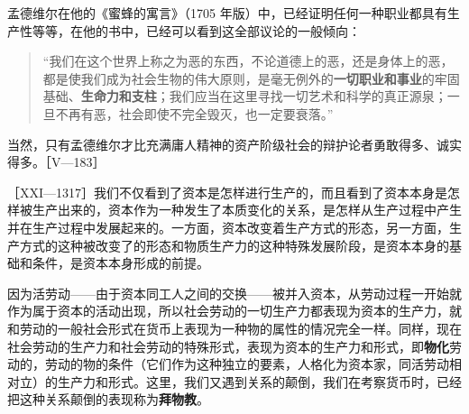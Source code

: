 孟德维尔在他的《蜜蜂的寓言》（1705 年版）中，已经证明任何一种职业都具有生产性等等，在他的书中，已经可以看到这全部议论的一般倾向：

\begin{quote}“我们在这个世界上称之为恶的东西，不论道德上的恶，还是身体上的恶，都是使我们成为社会生物的伟大原则，是毫无例外的\textbf{一切职业和事业}的牢固基础、\textbf{生命力和支柱}；我们应当在这里寻找一切艺术和科学的真正源泉；一旦不再有恶，社会即使不完全毁灭，也一定要衰落。”\end{quote}

当然，只有孟德维尔才比充满庸人精神的资产阶级社会的辩护论者勇敢得多、诚实得多。［V—183］



［XXI—1317］我们不仅看到了资本是怎样进行生产的，而且看到了资本本身是怎样被生产出来的，资本作为一种发生了本质变化的关系，是怎样从生产过程中产生并在生产过程中发展起来的。一方面，资本改变着生产方式的形态，另一方面，生产方式的这种被改变了的形态和物质生产力的这种特殊发展阶段，是资本本身的基础和条件，是资本本身形成的前提。

因为活劳动——由于资本同工人之间的交换——被并入资本，从劳动过程一开始就作为属于资本的活动出现，所以社会劳动的一切生产力都表现为资本的生产力，就和劳动的一般社会形式在货币上表现为一种物的属性的情况完全一样。同样，现在社会劳动的生产力和社会劳动的特殊形式，表现为资本的生产力和形式，即\textbf{物化}劳动的，劳动的物的条件（它们作为这种独立的要素，人格化为资本家，同活劳动相对立）的生产力和形式。这里，我们又遇到关系的颠倒，我们在考察货币时，已经把这种关系颠倒的表现称为\textbf{拜物教}。

